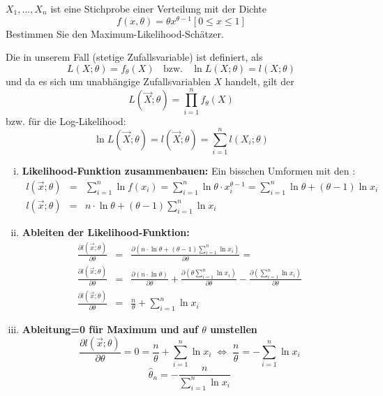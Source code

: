 \begin{uebsp}
\begin{Exercise}[label=ex:7.7]
$X_1,...,X_n$ ist eine Stichprobe einer Verteilung mit der Dichte
\[f(x,\theta)=\theta x^{\theta-1}[0\leq x\leq 1]\]
Bestimmen Sie den Maximum-Likelihood-Schätzer.
\end{Exercise}
\begin{Answer}

\begin{uebsp_theory}
Die  in unserem Fall (stetige Zufallsvariable) ist definiert, als 
\[L(X;\theta)=f_\theta(X)\;\;\text{ bzw. }\;\;\ln L(X;\theta)=l(X;\theta)\]
und da es sich um unabhängige Zufallsvariablen $X$ handelt, gilt der 
\[L(\vec X;\theta)=\prod_{i=1}^nf_\theta(X)\]
bzw. für die Log-Likelihood:
\[\ln L(\vec X;\theta)=l(\vec X;\theta)=\sum_{i=1}^nl(X_i;\theta)\]
\end{uebsp_theory}
\begin{enumerate}[i)]
    \item \textbf{Likelihood-Funktion zusammenbauen:}
    Ein bisschen Umformen mit den :
        \begin{eqnarray*}
            l(\vec x;\theta)&=&\sum_{i=1}^n\ln f(x_i) = \sum_{i=1}^n\ln \theta\cdot x_i^{\theta-1} = \sum_{i=1}^n\ln \theta + (\theta-1)\ln x_i\\
            l(\vec x;\theta)&=&n\cdot\ln\theta +(\theta-1)\sum_{i=1}^n \ln x_i
        \end{eqnarray*}
    \item \textbf{Ableiten der Likelihood-Funktion:}
        \begin{eqnarray*}
            \frac{\partial l(\vec x;\theta)}{\partial\theta}&=&\frac{\partial(n\cdot\ln\theta +(\theta-1)\sum_{i=1}^n \ln x_i)}{\partial\theta}=\\
            \frac{\partial l(\vec x;\theta)}{\partial\theta}&=&\frac{\partial(n\cdot\ln\theta)}{\partial\theta} +\frac{\partial(\theta\sum_{i=1}^n \ln x_i)}{\partial\theta}-\frac{\partial(\sum_{i=1}^n \ln x_i)}{\partial\theta}\\
            \frac{\partial l(\vec x;\theta)}{\partial\theta}&=&\frac{n}{\theta} +\sum_{i=1}^n \ln x_i
        \end{eqnarray*}
    \item \textbf{Ableitung=0 für Maximum und auf $\theta$ umstellen}
        \[\frac{\partial l(\vec x;\theta)}{\partial\theta}=0=\frac{n}{\theta} +\sum_{i=1}^n \ln x_i\;\Leftrightarrow\;\frac{n}{\theta}=-\sum_{i=1}^n \ln x_i\]
        \[\hat\theta_n=-\frac{n}{\sum_{i=1}^n \ln x_i}\]
\end{enumerate}
   
\end{Answer}
\end{uebsp}
